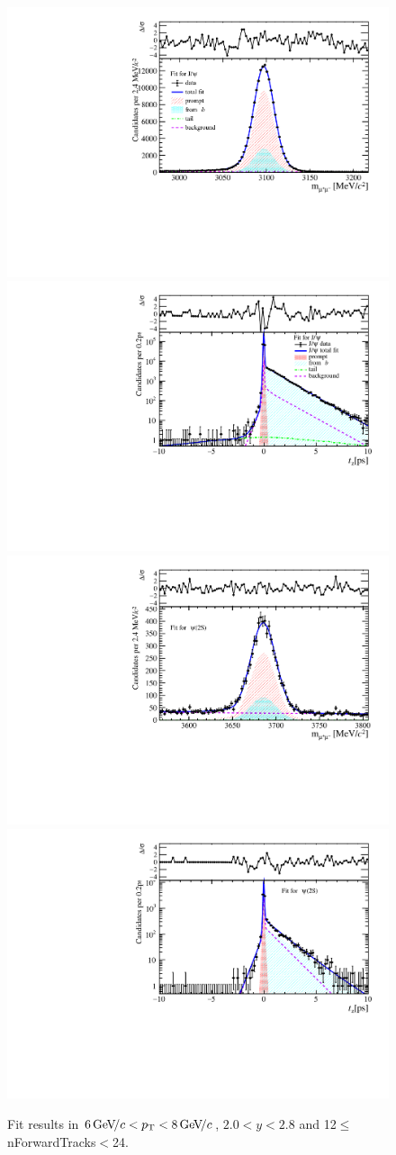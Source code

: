 \begin{figure}[H]
\begin{center}
\includegraphics[width=0.47\linewidth]{pdf/Jpsi/drawmassF/n2y1pt4.pdf}
\includegraphics[width=0.47\linewidth]{pdf/Jpsi/2DFitF/n2y1pt4.pdf}
\vspace*{-0.5cm}
\includegraphics[width=0.47\linewidth]{pdf/Psi2S/drawmassF/n2y1pt4.pdf}
\includegraphics[width=0.47\linewidth]{pdf/Psi2S/2DFitF/n2y1pt4.pdf}
\vspace*{-0.5cm}
\end{center}
\caption{Fit results in $6\text{\,Ge\kern -0.1em V\!/}c<p_{\mathrm{T}}<8\text{\,Ge\kern -0.1em V\!/}c$, $2.0<y<2.8$ and 12$\leq$nForwardTracks$<$24.}
\label{Fitn2y1pt4}
\end{figure}
